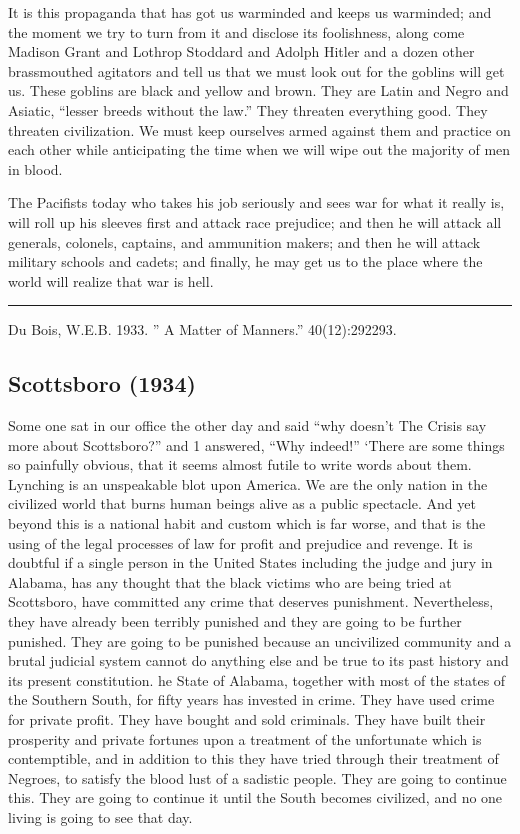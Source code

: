 \documentclass[letterpaper,10pt,english]{jupyterBook}
\begin{document}
\sphinxAtStartPar
It is this propaganda that has got us war\sphinxhyphen{}minded and keeps us war\sphinxhyphen{}minded; and the moment we try to turn from it and disclose its foolishness, along come Madison Grant and Lothrop Stoddard and Adolph Hitler and a dozen other brass\sphinxhyphen{}mouthed agitators and tell us that we must look out for the goblins will get us. These goblins are black and yellow and brown. They are Latin and Negro and Asiatic, “lesser breeds without the law.” They threaten everything good. They threaten civilization. We must keep ourselves armed against them and practice on each other while anticipating the time when we will wipe out the majority of men in blood.

\sphinxAtStartPar
The Pacifists today who takes his job seriously and sees war for what it really is, will roll up his sleeves first and attack race prejudice; and then he will attack all generals, colonels, captains, and ammunition makers; and then he will attack military schools and cadets; and finally, he may get us to the place where the world will realize that war is hell.


\bigskip\hrule\bigskip


\sphinxAtStartPar
{} Du Bois, W.E.B. 1933. ” A Matter of Manners.”  40(12):292\sphinxhyphen{}293.


\subsection{Scottsboro (1934)}
\label{\detokenize{Volumes/41/01/scottsboro:scottsboro-1934}}\label{\detokenize{Volumes/41/01/scottsboro::doc}}
\sphinxAtStartPar
Some one sat in our office the other day and said “why doesn’t The Crisis say more about Scottsboro?” and 1 answered, “Why indeed!” ‘There are some things so painfully obvious, that it seems almost futile to write words about them. Lynching is an unspeakable blot upon America. We are the only nation in the civilized world that burns human beings alive as a public spectacle. And yet beyond this is a national habit and custom which is far worse, and that is the using of the legal processes of law for profit and prejudice and revenge. It is doubtful if a single person in the United States including the judge and jury in Alabama, has any thought that the black victims who are being tried at Scottsboro, have committed any crime that deserves punishment. Nevertheless, they have already been terribly punished and they are going to be further punished. They are going to be punished because an uncivilized community and a brutal judicial system cannot do anything else and be true to its past history and its present constitution. he State of Alabama, together with most of the states of the Southern South, for fifty years has invested in crime. They have used crime for private profit. They have bought and sold criminals. They have built their prosperity and private fortunes upon a treatment of the unfortunate which is contemptible, and in addition to this they have tried through their treatment of Negroes, to satisfy the blood lust of a sadistic people. They are going to continue this. They are going to continue it until the South becomes civilized, and no one living is going to see that day.
\end{document}
